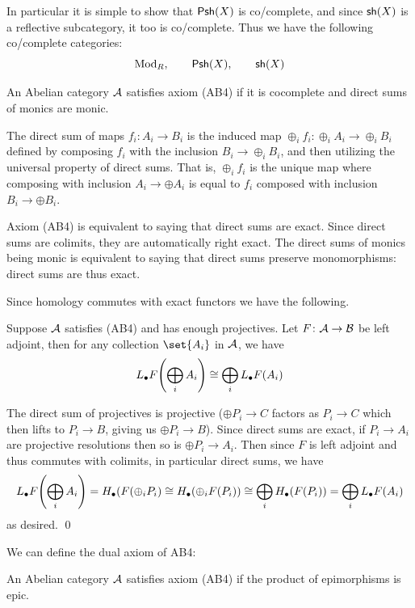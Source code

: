 In particular it is simple to show that ${\sf Psh}(X)$ is co/complete, and since ${\sf sh}(X)$ is a reflective subcategory, it too is co/complete.
Thus we have the following co/complete categories:
$$ {\rm Mod}_R,\qquad {\sf Psh}(X),\qquad {\sf sh}(X) $$

\bdefn

    An Abelian category ${{\cal A}}$ satisfies axiom {\emphcolor (AB4)} if it is cocomplete and direct sums of monics are monic.

\edefn

The direct sum of maps $f_i\colon A_i\to B_i$ is the induced map $\oplus_if_i\colon\oplus_iA_i\to\oplus_iB_i$ defined by composing $f_i$ with the inclusion $B_i\to\oplus_iB_i$,
and then utilizing the universal property of direct sums.
That is, $\oplus_if_i$ is the unique map where composing with inclusion $A_i\to\oplus A_i$ is equal to $f_i$ composed with inclusion $B_i\to\oplus B_i$.

Axiom (AB4) is equivalent to saying that direct sums are exact.
Since direct sums are colimits, they are automatically right exact.
The direct sums of monics being monic is equivalent to saying that direct sums preserve monomorphisms: direct sums are thus exact.

Since homology commutes with exact functors we have the following.

\bthrm

    Suppose ${{\cal A}}$ satisfies (AB4) and has enough projectives.
    Let $F\colon{{\cal A}}\to{{\cal B}}$ be left adjoint, then for any collection $\set{A_i}$ in ${{\cal A}}$, we have
    $$ L_\bullet F\mathopen{}\mathclose{\left(\bigoplus_iA_i\right)} \cong \bigoplus_iL_\bullet F(A_i) $$

\ethrm

\bproof

    The direct sum of projectives is projective ($\oplus P_i\to C$ factors as $P_i\to C$ which then lifts to $P_i\to B$, giving us $\oplus P_i\to B$).
    Since direct sums are exact, if $P_i\to A_i$ are projective resolutions then so is $\oplus P_i\to A_i$.
    Then since $F$ is left adjoint and thus commutes with colimits, in particular direct sums, we have
    $$ L_\bullet F\mathopen{}\mathclose{\left(\bigoplus_iA_i\right)} = H_\bullet(F(\oplus_iP_i) \cong H_\bullet(\oplus_iF(P_i)) \cong \bigoplus_iH_\bullet(F(P_i)) = \bigoplus_iL_\bullet F(A_i) $$
    as desired.
    \qed

\eproof

We can define the dual axiom of AB4:

\bdefn

    An Abelian category ${{\cal A}}$ satisfies axiom {\emphcolor (AB4\star)} if the product of epimorphisms is epic.

